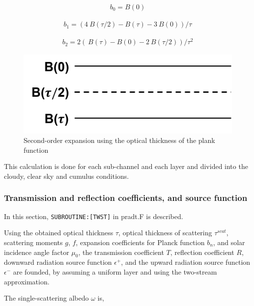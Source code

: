 \begin{eqnarray}
b_{0}=B(0)
\end{eqnarray}

\begin{eqnarray}
b_{1}=(4{~B}(\tau / 2)-{B}(\tau)-3{~B}(0)) / \tau
\end{eqnarray}

\begin{eqnarray}
b_{2}=2({~B}(\tau)-{B}(0)-2{~B}(\tau / 2)) / \tau^{2}
\end{eqnarray}

\begin{figure}
\centering
\includegraphics{Prad_Fig2.png}
\caption{Second-order expansion using the optical thickness of the plank function}
\end{figure}

This calculation is done for each sub-channel and each layer and divided into the cloudy, clear sky and cumulus conditions.

\hypertarget{transmission-and-reflection-coefficients-and-source-function}{%
\subsubsection{Transmission and reflection coefficients, and source function}\label{transmission-and-reflection-coefficients-and-source-function}}

In this section, \texttt{SUBROUTINE:{[}TWST{]}} in pradt.F is described.

Using the obtained optical thickness \(\tau\), optical thickness of scattering \(\tau^{scat}\), scattering moments \(g\), \(f\), expansion coefficients for Planck function \(b_n\), and solar incidence
angle factor \(\mu_{0}\), the transmission coefficient \(T\), reflection coefficient \(R\), downward radiation source function \(\epsilon^{+}\), and the upward radiation source function
\(\epsilon^{-}\) are founded, by assuming a uniform layer and using the two-stream approximation.

The single-scattering albedo \(\omega\) is,

